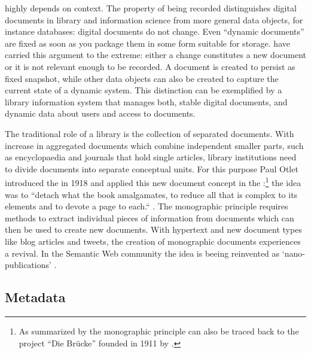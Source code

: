 highly depends on context.  The property of being recorded distinguishes
digital documents in library and information science from more general data
objects, for instance databases: digital documents do not change. Even
``dynamic documents'' are fixed as soon as you package them in some form
suitable for storage. \textcite{Renear2009} have carried this argument to the
extreme: either a change constitutes a new document or it is not relevant
enough to be recorded.  A document is created to persist as fixed snapshot,
while other data objects can also be created to capture the current state of a
dynamic system.  This distinction can be exemplified by a library information
system that manages both, stable digital documents, and dynamic data about
users and access to documents.

The traditional role of a library is the collection of separated documents.
With increase in aggregated documents which combine independent smaller parts,
such as encyclopaedia and journals that hold single articles, library
institutions need to divide documents into separate conceptual units. For this
purpose Paul Otlet introduced the  in 1918 and
applied this new document concept in the  \cite{Rayward1994,Otlet1990}:\footnote{As summarized by
\textcite{Hapke1999} the monographic principle can also be traced back to the
project ``Die Br\"ucke'' founded in 1911 by .} the
idea was to ``detach what the book amalgamates, to reduce all that is complex
to its elements and to devote a page to each.`` \cite[cited and translated by
Rayward]{Otlet1918}.  The monographic principle requires methods to extract
individual pieces of information from documents which can then be used to
create new documents. With hypertext and new document types like blog articles
and tweets, the creation of monographic documents experiences a revival. In the
Semantic Web community the idea is beeing reinvented as `nano-publications'
\cite{Groth2010,Mons2009}.

\subsection{Metadata}
\label{sub:metadata}

